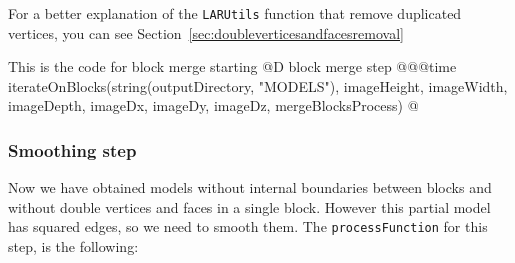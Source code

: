 \documentclass[11pt,oneside]{article}	%
\begin{document}
For a better explanation of the \texttt{LARUtils} function that remove duplicated vertices, you can see Section~\ref{sec:doubleverticesandfacesremoval}

This is the code for block merge starting
@D block merge step
@{@@time iterateOnBlocks(string(outputDirectory, "MODELS"),
                  imageHeight, imageWidth, imageDepth,
                  imageDx, imageDy, imageDz,
                  mergeBlocksProcess) @}


\subsubsection{Smoothing step}\label{sec:smoothingStep}

Now we have obtained models without internal boundaries between blocks and without double vertices and faces in a single block. However this partial model has squared edges, so we need to smooth them. The \texttt{processFunction} for this step, is the following:
\end{document}
